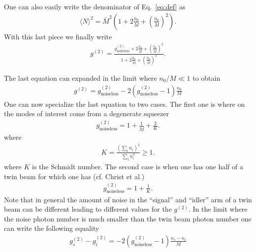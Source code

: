 \documentclass[aps,twocolumn,reprint,nofootinbib]{revtex4-1}
\newcommand{\braket}[1]{\langle #1 \rangle}
\newcommand{\eq}[1]{\begin{align}#1\end{align}}
\begin{document}
One can also easily write the denominator of Eq.~\eqref{eq:def} as
\eq{
\braket{N}^2 = \bar{M}^2 \left(1+ 2 \frac{\bar{n}_0}{\bar M} +\left(\frac{\bar{n}_0}{\bar M} \right)^2\right).
}
With this last piece we finally write
\eq{
g^{(2)} = \frac{  g^{(2)}_{\text{noiseless}} + 2 \frac{\bar{n}_0}{\bar M} +\left(\frac{\bar{n}_0}{\bar M} \right)^2}{1+ 2 \frac{\bar{n}_0}{\bar M} +\left(\frac{\bar{n}_0}{\bar M} \right)^2}.	
}

The last equation can expanded in the limit where $n_0/M \ll 1$ to obtain
\eq{
g^{(2)} = g^{(2)}_{\text{noiseless}} -2 \left(g^{(2)}_{\text{noiseless}} -1\right) \frac{n_0}{M}
}
One can now specialize the last equation to two cases. The first one is where on the modes of interest come from a degenerate squeezer
\eq{
	g^{(2)}_{\text{noiseless}} = 1+ \frac{1}{\bar{M}}+\frac{2}{K}.
}
where 
\eq{
K = \frac{\left( \sum_i \bar{n}_i\right)^2}{\sum_i \bar{n}_i^2} \geq 1.		
}
where $K$ is the Schmidt number.
The second case is when one has one half of a twin beam for which one has (cf. Christ et al.)
\eq{
g^{(2)}_{\text{noiseless}} = 1+\frac{1}{K}.
}
Note that in general the amount of noise in the ``signal'' and ``idler'' arm of a twin beam can be different leading to different values for the $g^{(2)}$. In the limit where the noise photon number is much smaller than the twin beam photon number one can write the following equality
\eq{
g^{(2)}_s - g^{(2)}_i = -2 (g^{(2)}_\text{noiseless} -1) \frac{n_s - n_i}{M}
}
\end{document}
